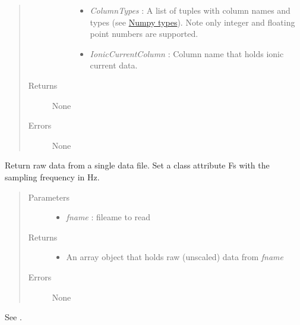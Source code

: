 \documentclass[letterpaper,10pt,english]{sphinxmanual}
\begin{document}
\begin{fulllineitems}
\begin{quote}
\begin{description}
\begin{description}
\begin{itemize}
\item {} 
\emph{ColumnTypes} :       A list of tuples with column names and types (see \href{http://docs.scipy.org/doc/numpy/user/basics.types.html}{Numpy types}). Note only integer and floating point numbers are supported.

\item {} 
\emph{IonicCurrentColumn} : Column name that holds ionic current data.

\end{itemize}

\end{description}

\item[{Returns}] \leavevmode
None

\item[{Errors}] \leavevmode
None

\end{description}\end{quote}

\begin{fulllineitems}
\label{api-doc/mosaic.traj:mosaic.binTrajIO.binTrajIO.readdata}
Return raw data from a single data file. Set a class 
attribute Fs with the sampling frequency in Hz.
\begin{quote}\begin{description}
\item[{Parameters}] \leavevmode\begin{itemize}
\item {} 
\emph{fname} :  fileame to read

\end{itemize}

\item[{Returns}] \leavevmode\begin{itemize}
\item {} 
An array object that holds raw (unscaled) data from \emph{fname}

\end{itemize}

\item[{Errors}] \leavevmode
None

\end{description}\end{quote}

\end{fulllineitems}


\begin{fulllineitems}
\label{api-doc/mosaic.traj:mosaic.binTrajIO.binTrajIO.scaleData}
See {\hyperref[api\string-doc/mosaic.meta:mosaic.metaTrajIO.metaTrajIO.scaleData]{\emph{}}}.

\end{fulllineitems}


\end{fulllineitems}
\end{document}
